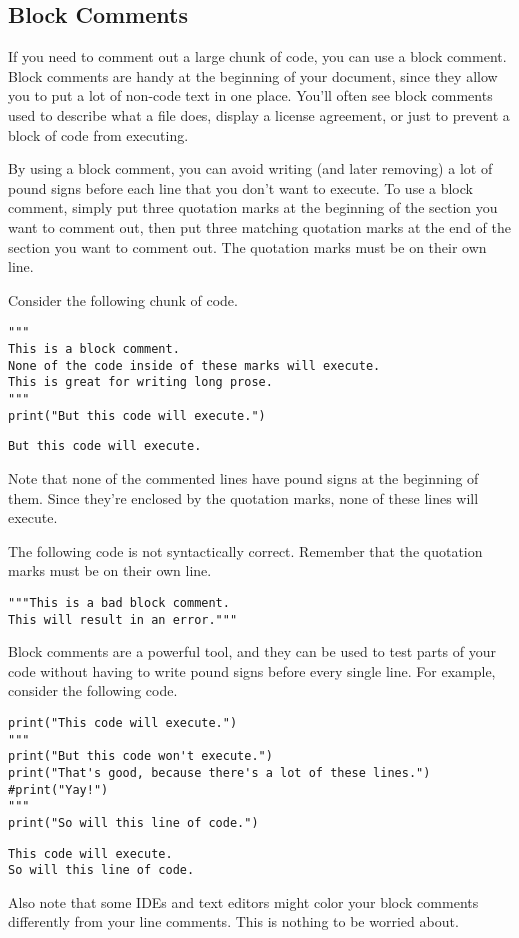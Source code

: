\subsection{Block Comments}
If you need to comment out a large chunk of code, you can use a block comment. Block comments are handy at the beginning of your document, since they allow you to put a lot of non-code text in one place. You'll often see block comments used to describe what a file does, display a license agreement, or just to prevent a block of code from executing.\par
By using a block comment, you can avoid writing (and later removing) a lot of pound signs before each line that you don't want to execute. To use a block comment, simply put three quotation marks at the beginning of the section you want to comment out, then put three matching quotation marks at the end of the section you want to comment out. The quotation marks must be on their own line.\par
Consider the following chunk of code.\par
\begin{lstlisting}[style=pippython]
"""
This is a block comment.
None of the code inside of these marks will execute.
This is great for writing long prose.
"""
print("But this code will execute.")
\end{lstlisting}
\begin{lstlisting}
But this code will execute.
\end{lstlisting}
Note that none of the commented lines have pound signs at the beginning of them. Since they're enclosed by the quotation marks, none of these lines will execute.\par
The following code is not syntactically correct. Remember that the quotation marks must be on their own line.\par
\begin{lstlisting}[style=pippython]
"""This is a bad block comment.
This will result in an error."""
\end{lstlisting}
Block comments are a powerful tool, and they can be used to test parts of your code without having to write pound signs before every single line. For example, consider the following code.\par
\begin{lstlisting}[style=pippython]
print("This code will execute.")
"""
print("But this code won't execute.")
print("That's good, because there's a lot of these lines.")
#print("Yay!")
"""
print("So will this line of code.")
\end{lstlisting}
\begin{lstlisting}
This code will execute.
So will this line of code.
\end{lstlisting}
Also note that some IDEs and text editors might color your block comments differently from your line comments. This is nothing to be worried about.
